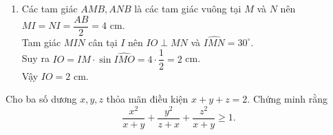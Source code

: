 \begin{ex}
{\begin{enumerate}
Vì $D$ là trung điểm của $HK$ nên các tam giác $DMH, DNK, DMN$ cân tại $D$. Suy ra \begin{align*}
& \widehat{DMN} = 180^\circ - \widehat{AMN} - \widehat{DHM};\\
& \widehat{DNM} = 180^\circ - \widehat{ANM} - \widehat{DKN}.
\end{align*}
$\Rightarrow$ $\widehat{DMN} + \widehat{DNM} = 360^\circ - (\widehat{AMN} + \widehat{ANM}) - (\widehat{DHM} + \widehat{DKN}) = 360^\circ - 120^\circ -120^\circ = 120^\circ$.\\
$\Rightarrow$ $\widehat{DMI} + \widehat{DNI} = \widehat{DMN} + \widehat{DNM} + 180^\circ - \widehat{MIN} = 180^\circ$.\\
Tứ giác $MIND$ có tổng hai góc đối bằng $180^\circ$ nên là tứ giác nội tiếp.
\item Các tam giác $AMB, ANB$ là các tam giác vuông tại $M$ và $N$ nên $MI = NI = \dfrac{AB}{2} = 4$ cm.\\
Tam giác $MIN$ cân tại $I$ nên $IO \perp MN$ và $\widehat{IMN} = 30^\circ$.\\
Suy ra $IO = IM \cdot \sin \widehat{IMO} = 4 \cdot \dfrac{1}{2} = 2$ cm.\\
Vậy $IO = 2$ cm.
\end{enumerate}

}


\end{ex}



\begin{ex}%
Cho ba số dương $x, y, z$ thỏa mãn điều kiện $x + y + z = 2$. Chứng minh rằng $$\dfrac{x^2}{x + y} + \dfrac{y^2}{z + x} + \dfrac{z^2}{x + y} \geq 1.$$
\end{ex}

